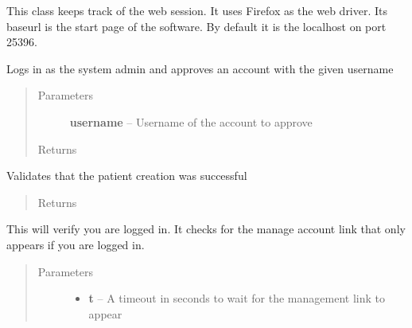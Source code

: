 \documentclass[letterpaper,10pt,english]{sphinxmanual}
\begin{document}
\begin{fulllineitems}
\label{STD/WebUI:WebUI.WebUI.WebUI}
This class keeps track of the web session. It uses Firefox as the web driver. Its baseurl is the start page of
the software. By default it is the localhost on port 25396.

\begin{fulllineitems}
\label{STD/WebUI:WebUI.WebUI.WebUI.approve_account}
Logs in as the system admin and approves an account with the given username
\begin{quote}\begin{description}
\item[{Parameters}] \leavevmode
\textbf{username} -- Username of the account to approve

\item[{Returns}] \leavevmode


\end{description}\end{quote}

\end{fulllineitems}


\begin{fulllineitems}
\label{STD/WebUI:WebUI.WebUI.WebUI.check_create_patient}
Validates that the patient creation was successful
\begin{quote}\begin{description}
\item[{Returns}] \leavevmode


\end{description}\end{quote}

\end{fulllineitems}


\begin{fulllineitems}
\label{STD/WebUI:WebUI.WebUI.WebUI.check_login}
This will verify you are logged in. It checks for the manage account link that only appears if you are
logged in.
\begin{quote}\begin{description}
\item[{Parameters}] \leavevmode\begin{itemize}
\item {} 
\textbf{t} -- A timeout in seconds to wait for the management link to appear


\end{itemize}
\end{description}
\end{quote}
\end{fulllineitems}
\end{fulllineitems}
\end{document}
